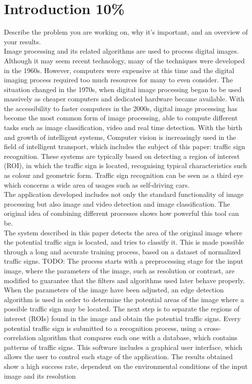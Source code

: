 \section{Introduction 10\%}
Describe the problem you are working on, why it's important, and an overview of your results.\\
Image processing and its related algorithms are used to process digital images. Although it may seem recent technology, many of the techniques were developed in the 1960s. However, computers were expensive at this time and the digital imaging process required too much resources for many to even consider. The situation changed in the 1970s, when digital image processing began to be used massively as cheaper computers and dedicated hardware became available. With the accessibility to faster computers in the 2000s, digital image processing has become the most common form of image processing, able to compute different tasks such as image classification, video and real time detection. With the birth and growth of intelligent systems, Computer vision is increasingly used in the field of intelligent transport, which includes the subject of this paper: traffic sign recognition. These systems are typically based on detecting a region of interest (ROI), in which the traffic sign is located, recognising typical characteristics such as colour and geometric form.
Traffic sign recognition can be seen as a third eye which concerns a wide area of usages such as self-driving cars.\\

The application developed includes not only the standard functionality of image processing but also image and video detection and image classification. The original idea of combining different processes shows how powerful this tool can be.\\

The system described in this paper detects the area of the original image where the potential traffic sign is located, and tries to classify it. This is made possible through a long and accurate training process, based on a dataset of normalized traffic signs. TODO: The process starts with a preprocessing stage for the input image, where the parameters of the image, such as resolution or contrast, are modified to guarantee that the filters and algorithms used later behave properly. When the parameters of the image have been adjusted, an edge detection algorithm is used in order to determine the potential areas of the image where a possible traffic sign may be located. The next step is to separate the regions of interest (ROIs) found in the image and obtain the potential traffic signs. Every potential traffic sign is submitted to a recognition process, using a cross-correlation algorithm that compares each one with a database, which contains patterns of traffic signs. This software includes a graphical user interface, which allows the user to control each stage of the application. The results obtained show a high success rate, dependent on the environmental conditions of the input image and its resolution
